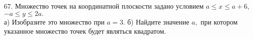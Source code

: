 67. Множество точек на координатной плоскости задано условием $a\le x \le a+6,$\\
$-a \le y \le 2a.$\\
а) Изобразите это множество при $a=3.$ б) Найдите значение $a,$ при котором указанное множество точек будет являться квадратом.\\
